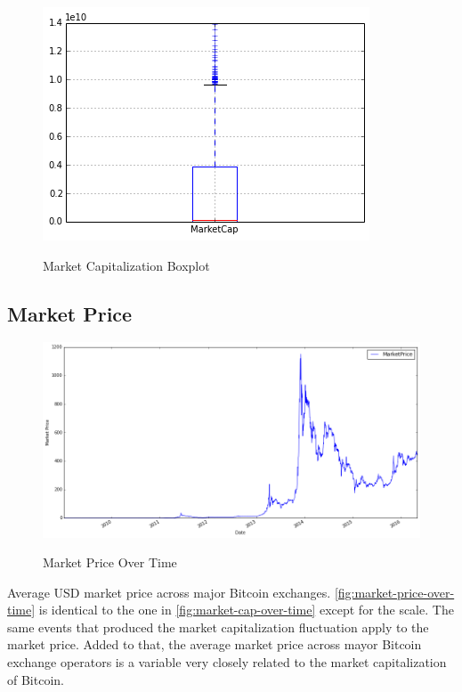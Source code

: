 \begin{figure}[bth]
  \myfloatalign
  {\includegraphics[width=1\linewidth]
    {gfx/market-cap-boxplot}}
  \caption{Market Capitalization Boxplot}
  \label{fig:market-cap-boxplot}
\end{figure}

\clearpage

\subsection{Market Price}
\label{sec:market-price}

\begin{figure}[bth]
  \myfloatalign
  {\includegraphics[width=1\linewidth]
    {gfx/market-price-over-time}}
  \caption{Market Price Over Time}
  \label{fig:market-price-over-time}
\end{figure}

Average USD market price across major Bitcoin exchanges.
\autoref{fig:market-price-over-time} is identical to the one in
\autoref{fig:market-cap-over-time} except for the scale. The same
events that produced the market capitalization fluctuation apply to
the market price. Added to that, the average market price across mayor
Bitcoin exchange operators is a variable very closely related to the
market capitalization of Bitcoin.

